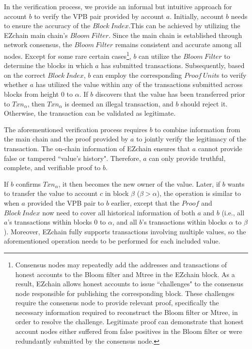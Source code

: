 \documentclass[conference]{IEEEtran}
\begin{document}
In the verification process, we provide an informal but intuitive approach for account $b$ to verify the VPB pair provided by account $a$. Initially, account $b$ needs to ensure the accuracy of the $Block~Index$.This can be achieved by utilizing the EZchain main chain's $Bloom~Filter$. Since the main chain is established through network consensus, the $Bloom~Filter$ remains consistent and accurate among all nodes. Except for some rare certain cases\footnote{Consensus nodes may repeatedly add the addresses and transactions of honest accounts to the Bloom filter and Mtree in the EZchain block. As a result, EZchain allows honest accounts to issue ``challenges" to the consensus node responsible for publishing the corresponding block. These challenges require the consensus node to provide relevant proof, specifically the necessary information required to reconstruct the Bloom filter or Mtree, in order to resolve the challenge. Legitimate proof can demonstrate that honest account nodes either suffered from false positives in the Bloom filter or were redundantly submitted by the consensus node.}, $b$ can utilize the $Bloom~Filter$ to determine the blocks in which $a$ has submitted transactions. Subsequently, based on the correct $Block~Index$, $b$ can employ the corresponding $Proof~Unit$s to verify whether $a$ has utilized the value within any of the transactions submitted across blocks from height $0$ to $\alpha$. If $b$ discovers that the value has been transferred prior to $Txn_{\alpha}$, then $Txn_{\alpha}$ is deemed an illegal transaction, and $b$ should reject it. Otherwise, the transaction can be validated as legitimate.

The aforementioned verification process requires $b$ to combine information from the main chain and the proof provided by $a$ to jointly verify the legitimacy of the transaction. The on-chain information of EZchain ensures that $a$ cannot provide false or tampered ``value's history". Therefore, $a$ can only provide truthful, complete, and verifiable proof to $b$.

If $b$ confirms $Txn_{\alpha}$, it then becomes the new owner of the value. Later, if $b$ wants to transfer the value to account $c$ in block $\beta$ ($\beta > \alpha$), the operation is similar to when $a$ provided the VPB pair to $b$ earlier, except that the $Proof$ and $Block~Index$ now need to cover all historical information of both $a$ and $b$ (i.e., all $a$'s transactions within blocks $0$ to $\alpha$, and all $b$'s transactions within blocks $\alpha$ to $\beta$). Moreover, EZchain fully supports transactions involving multiple values, so the aforementioned operation needs to be performed for each included value.
\end{document}

